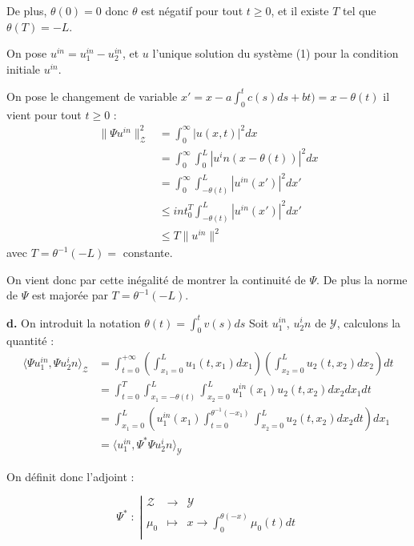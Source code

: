 \documentclass[a4paper]{article}
\newcommand{\Y}{\mathscr{Y}}
\newcommand{\Z}{\mathscr{Z}}
\begin{document}
De plus, $\theta (0) =0$ donc $\theta$ est négatif pour tout $t \geq 0$,
et il existe $T$ tel que $\theta(T) = - L$.

On pose $u^{in} = u_1^{in} - u_2^{in}$, et $u$ l'unique solution du système (1) pour la condition initiale $u^{in}$.

On pose le changement de variable $x'=x - a\int_0^tc(s)ds + bt) = x - \theta (t)$ il vient pour tout $t \geq 0$ :
\[ \begin{split}
\|\Psi u^{in}\|_{\Z}^2 &= \int_0^\infty |u(x,t)|^2 dx \\
			   &= \int_0^\infty \int_0^L |u^in( x - \theta(t))|^2 dx \\
			   &= \int_0^\infty \int_{-\theta(t)}^{L} |u^{in}(x')|^2 dx' \\
			   & \leq int_0^T \int_{-\theta(t)}^L |u^{in}(x')|^2 dx'\\
			   & \leq T \| u^{in} \|^2
\end{split}\]
avec $T = \theta^{-1}(-L) =$ constante.

On vient donc par cette inégalité de montrer la continuité de $\Psi$. De plus la norme de $\Psi$ est majorée par $T = \theta ^{-1}(-L)$.

\textbf{d.}
On introduit la notation $\theta(t)= \int_0^t v(s)ds$
Soit $u_1^{in}$, $u_2^in$ de $\mathscr{Y}$,
calculons la quantité :
\[
\begin{split}
	\langle \Psi u_1^{in}, \Psi u_2^in \rangle_{\mathscr{Z}}  
	                                  &= \int_{t=0}^{+\infty} 
									  (\int_{x_1=0}^L u_1(t,x_1)dx_1)
									  (\int_{x_2=0}^L u_2(t,x_2) dx_2)
									  dt\\
	                                  &= \int_{t=0}^{T} 
									  \int_{x_1=-\theta(t)}^L \int_{x_2=0}^L
									  u_1^{in}(x_1)
									   u_2(t,x_2) 
									  dx_2dx_1dt\\
	                                  &= \int_{x_1=0}^L
									  (u_1^{in}(x_1)
									  \int_{t=0}^{\theta^{-1}(-x_1)} 
									   \int_{x_2=0}^L
									   u_2(t,x_2) 
									  dx_2 dt )dx_1\\
	                                  &= \langle u_1^{in},
									  \Psi^* \Psi u_2^in \rangle_{\mathscr{Y}}
\end{split}
\]

On définit donc l'adjoint :

\begin{equation}
	 \Psi^* \; : \; \left\vert
	\begin{array}{ccc}
	\Z & \to & \Y \\
	\mu_0 & \mapsto & x \to \int_0^{\theta(-x)} \mu_0(t)dt \\
	\end{array} \right.
\end{equation}
\end{document}

